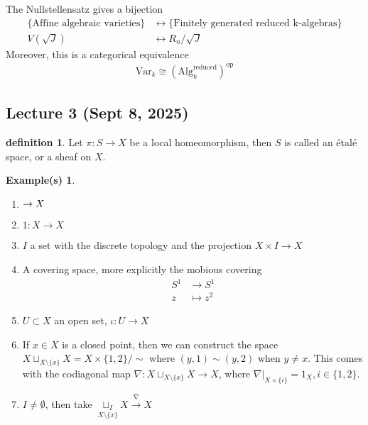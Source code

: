 \documentclass[10.5pt]{article}
\theoremstyle{definition}
\newtheorem{definition}{definition}
\newtheorem*{example}{Example(s)}
\newcommand{\set}[1]{\{#1\}}
\begin{document}
    The Nullstellensatz gives a bijection
    \begin{align*}
        \set{\text{Affine algebraic varieties}} &\longleftrightarrow \set{\text{Finitely generated reduced k-algebras}} \\
        V(\sqrt{J}) &\longleftrightarrow R_n/\sqrt{J}
    \end{align*}
    Moreover, this is a categorical equivalence
    \begin{align*}
        \text{Var}_k \cong \left(\text{Alg}_k^{\text{reduced}}\right)^{\text{op}}
    \end{align*}
    

    \subsection{Lecture 3 (Sept 8, 2025)}

    \begin{definition}
        Let \(\pi: S \to X\) be a local homeomorphism, then \(S\) is called an \'etal\'e space, or a sheaf on \(X\).
    \end{definition}

    \begin{example}
        \begin{enumerate}
            \item \(\empty \to X\)
            \item \(1: X \to X\)
            \item \(I\) a set with the discrete topology and the projection \(X \times I \to X\)
            \item A covering space, more explicitly the mobious covering
            \begin{align*}
                S^1 &\to S^1 \\ z &\mapsto z^2
            \end{align*}
            \item \(U \subset X\) an open set, \(\iota: U \to X\)
            \item If \(x \in X\) is a closed point, then we can construct the space \(X \sqcup_{X \setminus \set{x}}X = X \times \set{1,2}/\sim\) where \((y,1) \sim (y,2)\) when \(y \neq x\). This comes with the codiagonal map \(\nabla: X \sqcup_{X \setminus \set{x}}X \to X\), where \(\nabla\vert_{X \times \set{i}} = 1_X, i \in \set{1,2}\).
            \item \(I \neq \emptyset\), then take \(\underset{X \setminus \set{x}}{\sqcup_I} X \overset{\nabla}{\longrightarrow} X\)
        \end{enumerate}
    \end{example}
\end{document}
